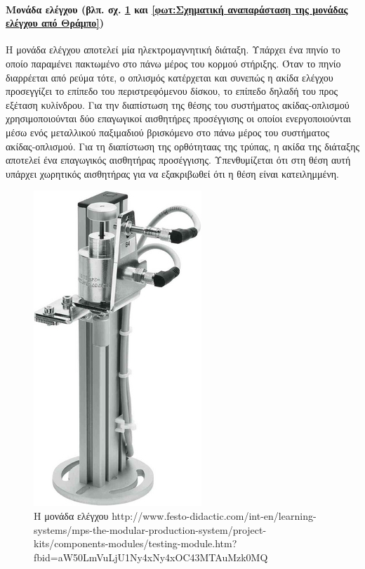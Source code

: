 \documentclass[a4paper,12pt,twoside]{report}
\begin{document}
				\paragraph{Μονάδα ελέγχου {\footnotesize (βλπ. σχ. \ref{φωτ:Η μονάδα ελέγχου από Festo} και \ref{φωτ:Σχηματική αναπαράσταση της μονάδας ελέγχου από Θράμπο})}} {Η μονάδα ελέγχου αποτελεί μία \gls{ηλεκτρομαγνητική διάταξη}. Υπάρχει ένα πηνίο το οποίο παραμένει πακτωμένο στο πάνω μέρος του κορμού στήριξης. Όταν το πηνίο διαρρέεται από ρεύμα τότε, ο οπλισμός κατέρχεται και συνεπώς η ακίδα ελέγχου προσεγγίζει το επίπεδο του περιστρεφόμενου δίσκου, το επίπεδο δηλαδή του προς εξέταση κυλίνδρου. Για την διαπίστωση της θέσης του συστήματος ακίδας-οπλισμού χρησιμοποιούνται δύο επαγωγικοί αισθητήρες προσέγγισης οι οποίοι ενεργοποιούνται μέσω ενός μεταλλικού παξιμαδιού βρισκόμενο στο πάνω μέρος του συστήματος ακίδας-οπλισμού. Για τη διαπίστωση της ορθότηταας της τρύπας, η ακίδα της διάταξης αποτελεί ένα επαγωγικός αισθητήρας προσέγγισης.  Υπενθυμίζεται ότι στη θέση αυτή υπάρχει χωρητικός αισθητήρας για να εξακριβωθεί ότι η θέση είναι κατειλημμένη.
				}
				\begin{figure}[hp]
					\centering
					\includegraphics[scale=0.5]{ProcessingStationTestingModuleFesto.png}
					\caption{Η μονάδα ελέγχου {\footnotesize http://www.festo-didactic.com/int-en/learning-systems/mps-the-modular-production-system/project-kits/components-modules/testing-module.htm?fbid=aW50LmVuLjU1Ny4xNy4xOC43MTAuMzk0MQ}}
					\label{φωτ:Η μονάδα ελέγχου από Festo}
				\end{figure}
				
\end{document}
